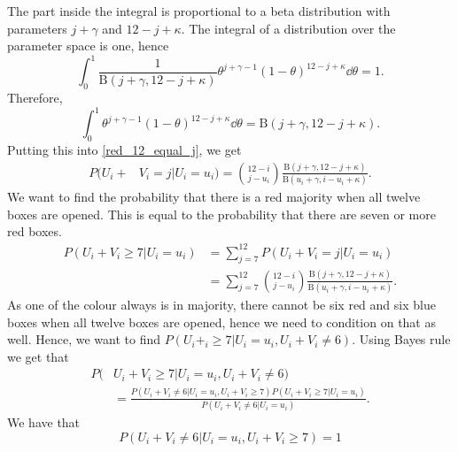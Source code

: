 The part inside the integral is proportional to a beta distribution with parameters $j+\gamma$ and $12-j+\kappa$. The integral of a distribution over the parameter space is one, hence
\begin{equation*}
    \int_0^1 \frac{1}{\text{B}(j+\gamma,12-j+\kappa)}\theta^{j+\gamma-1}(1-\theta)^{12-j+\kappa} \dd \theta = 1.
\end{equation*}
Therefore,
\begin{equation*}
    \int_0^1 \theta^{j+\gamma-1}(1-\theta)^{12-j+\kappa} \dd \theta = \text{B}(j+\gamma,12-j+\kappa).
\end{equation*}
Putting this into \eqref{red_12_equal_j}, we get
\begin{equation}
\label{red_12_equal_j_final}
    \begin{aligned}
        P(U_i+&V_i = j | U_i=u_i) = \binom{12-i}{j-u_i} \frac{\text{B}(j+\gamma,12-j+\kappa)}{\text{B}(u_i+\gamma,i-u_i+\kappa)}.
    \end{aligned}
\end{equation}
We want to find the probability that there is a red majority when all twelve boxes are opened. This is equal to the probability that there are seven or more red boxes. 
\begin{equation}
\label{redmajor1}
    \begin{aligned}
        P(U_i+V_i \geq 7 | U_i=u_i) 
        &= \sum_{j=7}^{12} P(U_i+V_i = j | U_i=u_i)\\[6pt]
        &= \sum_{j=7}^{12} \binom{12-i}{j-u_i} \frac{\text{B}(j+\gamma,12-j+\kappa)}{\text{B}(u_i+\gamma,i-u_i+\kappa)}.
    \end{aligned}
\end{equation}
As one of the colour always is in majority, there cannot be six red and six blue boxes when all twelve boxes are opened, hence we need to condition on that as well. Hence, we want to find $P(U_i+_i \geq 7 | U_i=u_i,U_i+V_i \neq 6)$. Using Bayes rule we get that
\begin{equation}
\label{redmajor2}
    \begin{aligned}
        P(&U_i+V_i \geq 7 | U_i=u_i,U_i+V_i \neq 6) \\[6pt]
        &= \frac{P(U_i+V_i\neq6|U_i=u_i,U_i+V_i\geq7)P(U_i+V_i\geq7|U_i=u_i)}{P(U_i+V_i\neq6|U_i=u_i)}.
    \end{aligned}
\end{equation}
We have that
\begin{equation*}
    P(U_i+V_i\neq6|U_i=u_i,U_i+V_i\geq7)=1
\end{equation*}

